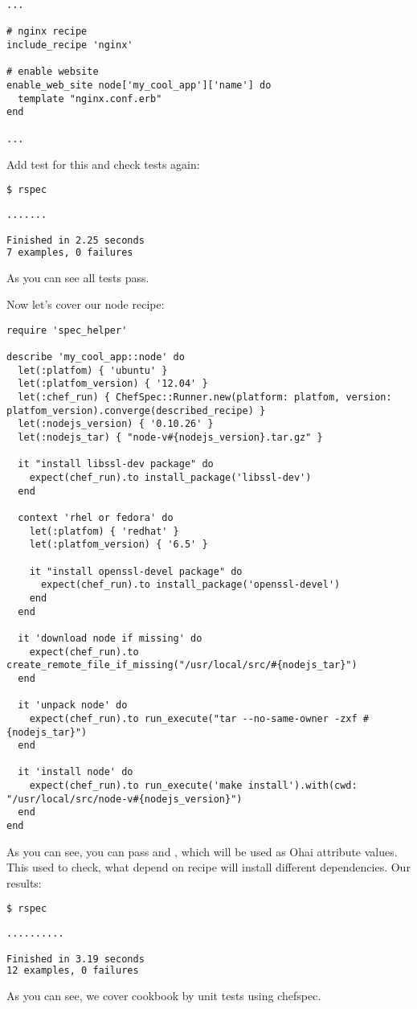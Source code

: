 \begin{lstlisting}[label=lst:testing-chefspec6,title=my-server-cloud/site-cookbooks/my\_cool\_app/recipes/default.rb]
...

# nginx recipe
include_recipe 'nginx'

# enable website
enable_web_site node['my_cool_app']['name'] do
  template "nginx.conf.erb"
end

...
\end{lstlisting}

Add test for this  and check tests again:

\begin{lstlisting}[language=Bash,label=lst:testing-chefspec7]
$ rspec

.......

Finished in 2.25 seconds
7 examples, 0 failures
\end{lstlisting}

As you can see all tests pass.

Now let's cover our node recipe:

\begin{lstlisting}[label=lst:testing-chefspec8,title=my-server-cloud/site-cookbooks/my\_cool\_app/spec/unit/recipes/node\_spec.rb]
require 'spec_helper'

describe 'my_cool_app::node' do
  let(:platfom) { 'ubuntu' }
  let(:platfom_version) { '12.04' }
  let(:chef_run) { ChefSpec::Runner.new(platform: platfom, version: platfom_version).converge(described_recipe) }
  let(:nodejs_version) { '0.10.26' }
  let(:nodejs_tar) { "node-v#{nodejs_version}.tar.gz" }

  it "install libssl-dev package" do
    expect(chef_run).to install_package('libssl-dev')
  end

  context 'rhel or fedora' do
    let(:platfom) { 'redhat' }
    let(:platfom_version) { '6.5' }

    it "install openssl-devel package" do
      expect(chef_run).to install_package('openssl-devel')
    end
  end

  it 'download node if missing' do
    expect(chef_run).to create_remote_file_if_missing("/usr/local/src/#{nodejs_tar}")
  end

  it 'unpack node' do
    expect(chef_run).to run_execute("tar --no-same-owner -zxf #{nodejs_tar}")
  end

  it 'install node' do
    expect(chef_run).to run_execute('make install').with(cwd: "/usr/local/src/node-v#{nodejs_version}")
  end
end
\end{lstlisting}

As you can see, you can pass  and , which will be used as Ohai attribute values. This used to check, what depend on  recipe will install different dependencies. Our results:

\begin{lstlisting}[language=Bash,label=lst:testing-chefspec9]
$ rspec

..........

Finished in 3.19 seconds
12 examples, 0 failures
\end{lstlisting}

As you can see, we cover cookbook by unit tests using chefspec.